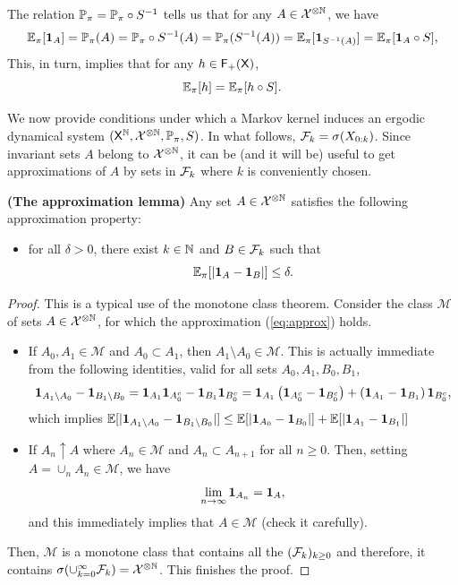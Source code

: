 \documentclass[english,graybox,envcountchap,envcountsame,sectrefs,shortlabels]{svmono}
\theoremstyle{style}
\newenvironment{svmultproof}{\small \begin{proof}}{\end{proof}}
\begin{document}
The relation $\mathbb{P}_{\pi}=\mathbb{P}_{\pi}\circ S^{-1}$ tells us that for
any $A\in\mathcal{X}^{\otimes\mathbb{N}}$, we have
\[
\mathbb{E}_{\pi}[\mathbf{1}_{A}]=\mathbb{P}_{\pi}(A)=\mathbb{P}_{\pi}\circ S^{-1}(A)=\mathbb{P}_{\pi}(S^{-1}(A))=\mathbb{E}_{\pi}[\mathbf{1}_{S^{-1}(A)}]=\mathbb{E}_{\pi}[\mathbf{1}_{A}\circ S],
\]
This, in turn, implies that for any $h\in\mathsf{F_{+}}(\mathsf{X})$,
\[
\mathbb{E}_{\pi}[h]=\mathbb{E}_{\pi}[h\circ S].
\]

We now provide conditions under which a Markov kernel induces an ergodic
dynamical system $(\mathsf{X}^{\mathbb{N}},\mathcal{X}^{\otimes\mathbb{N}},\mathbb{P}_{\pi},S)$.
In what follows, $\mathcal{F}_{k}=\sigma(X_{0:k})$. Since invariant sets
$A$ belong to $\mathcal{X}^{\otimes\mathbb{N}}$, it can be (and it will be)
useful to get approximations of $A$ by sets in $\mathcal{F}_{k}$ where
$k$ is conveniently chosen.
\begin{lemma}
\textbf{\label{lem:approx}(The approximation lemma)} Any set $A\in\mathcal{X}^{\otimes\mathbb{N}}$
satisfies the following approximation property:
\begin{itemize}
\item for all $\delta>0$, there exist $k\in\mathbb{N}$ and $B\in\mathcal{F}_{k}$
such that
\begin{equation}
\mathbb{E}_{\pi}[|\mathbf{1}_{A}-\mathbf{1}_{B}|]\leq\delta.\label{eq:approx}
\end{equation}
\end{itemize}
\end{lemma}
\begin{svmultproof}
This is a typical use of the monotone class theorem. Consider the
class $\mathcal{M}$ of sets $A\in\mathcal{X}^{\otimes\mathbb{N}}$, for which
the approximation (\ref{eq:approx}) holds.
\begin{itemize}
\item If $A_{0},A_{1} \in \mathcal{M}$ and $A_{0}\subset A_{1}$, then $A_{1}\setminus A_{0}\in\mathcal{M}$.
This is actually immediate from the following identities, valid for
all sets $A_{0},A_{1},B_{0},B_{1}$,
$$
\mathbf{1}_{A_{1}\setminus A_{0}}-\mathbf{1}_{B_{1}\setminus B_{0}} =\mathbf{1}_{A_{1}}\mathbf{1}_{A_{0}^c}-\mathbf{1}_{B_{1}}\mathbf{1}_{B_{0}^c}=\mathbf{1}_{A_{1}}\left(\mathbf{1}_{A_{0}^c} -\mathbf{1}_{B_0^c}\right)+\left(\mathbf{1}_{A_1}-\mathbf{1}_{B_1}\right)\mathbf{1}_{B_0^c},  
$$
which implies $\mathbb{E}[|\mathbf{1}_{A_{1}\setminus A_{0}}-\mathbf{1}_{B_{1}\setminus B_{0}}|]\leq\mathbb{E}[|\mathbf{1}_{A_{0}}-\mathbf{1}_{B_{0}}|] +\mathbb{E}[|\mathbf{1}_{A_{1}}-\mathbf{1}_{B_{1}}|]$
\item If $A_{n}\uparrow A$ where $A_{n}\in\mathcal{M}$ and $A_{n}\subset A_{n+1}$
for all $n\geq0$. Then, setting $A=\cup_{n}A_{n}\in\mathcal{M}$,
we have
\[
\lim_{n\to\infty}\mathbf{1}_{A_{n}}=\mathbf{1}_{A},
\]
and this immediately implies that $A\in\mathcal{M}$ (check it carefully).
\end{itemize}
Then, $\mathcal{M}$ is a monotone class that contains all the $(\mathcal{F}_{k})_{k\geq0}$
and therefore, it contains $\sigma(\cup_{k=0}^{\infty}\mathcal{F}_{k})=\mathcal{X}^{\otimes\mathbb{N}}$.
This finishes the proof.
\end{svmultproof}
\end{document}
